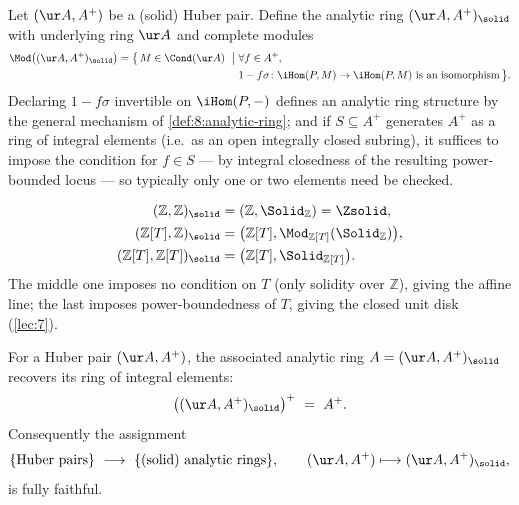 \begin{definition}
\label{def:8:mod-from-huber-pair}
Let $(\ur A,A^{+})$ be a (solid) Huber pair. Define the analytic ring
$(\ur A,A^{+})_{\solid}$ with underlying ring $\ur A$ and complete modules
\begin{equation*}
\begin{aligned}
\Mod\bigl((\ur A,A^{+})_{\solid}\bigr)=\bigl\{\,M\in\Cond(\ur A)\ \bigm|\ &
\forall f\in A^{+},\\
&1-f\sigma\colon\iHom(P,M)\to\iHom(P,M)\ \text{is an isomorphism}\,\bigr\}.
\end{aligned}
\end{equation*}
Declaring $1-f\sigma$ invertible on $\iHom(P,-)$ defines an analytic ring
structure by the general mechanism of \cref{def:8:analytic-ring}; and if
$S\subseteq A^{+}$ generates $A^{+}$ as a ring of integral elements (i.e.\ as an
open integrally closed subring), it suffices to impose the condition for $f\in S$
--- by integral closedness of the resulting power-bounded locus --- so typically
only one or two elements need be checked.
\end{definition}

\begin{example}
\label{ex:8:three-structures}
\begin{align}
\label{eq:8:three-structures}
(\mathbb{Z},\mathbb{Z})_{\solid}&=(\mathbb{Z},\Solid_{\mathbb{Z}})=\Zsolid,\notag\\
(\mathbb{Z}[T],\mathbb{Z})_{\solid}&=\bigl(\mathbb{Z}[T],\Mod_{\mathbb{Z}[T]}(\Solid_{\mathbb{Z}})\bigr),\\
(\mathbb{Z}[T],\mathbb{Z}[T])_{\solid}&=\bigl(\mathbb{Z}[T],\Solid_{\mathbb{Z}[T]}\bigr).\notag
\end{align}
The middle one imposes no condition on $T$ (only solidity over $\mathbb{Z}$),
giving the affine line; the last imposes power-boundedness of $T$, giving the
closed unit disk (\cref{lec:7}).
\end{example}

\begin{proposition}
\label{prop:8:huber-fully-faithful}
For a Huber pair $(\ur A,A^{+})$, the associated analytic ring
$A=(\ur A,A^{+})_{\solid}$ recovers its ring of integral elements:
\begin{equation*}
\bigl((\ur A,A^{+})_{\solid}\bigr)^{+}\ =\ A^{+}.
\end{equation*}
Consequently the assignment
\begin{equation*}
\{\text{Huber pairs}\}\ \longrightarrow\ \{\text{(solid) analytic rings}\},
\qquad (\ur A,A^{+})\longmapsto(\ur A,A^{+})_{\solid},
\end{equation*}
is fully faithful.
\end{proposition}

